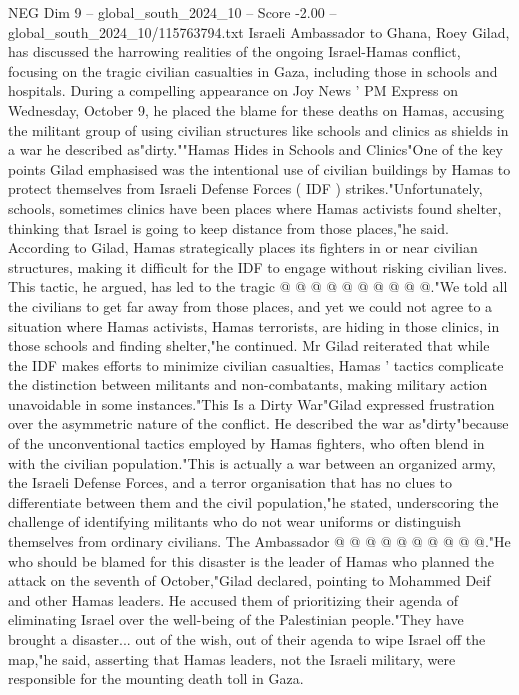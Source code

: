 \begin{textsample}{NEG Dim 9 – global\_south\_2024\_10 – Score -2.00 – global\_south\_2024\_10/115763794.txt}  \label{ex:f9_neg_370}
Israeli Ambassador to Ghana, Roey Gilad, has discussed the harrowing realities of the ongoing Israel-Hamas conflict, focusing on the tragic civilian casualties in Gaza, including those in schools and hospitals.
During a compelling appearance on Joy News ' PM Express on Wednesday, October 9, he placed the blame for these deaths on Hamas, accusing the militant group of using civilian structures like schools and clinics as shields in a war he described as"dirty.""Hamas Hides in Schools and Clinics"One of the key points Gilad emphasised was the intentional use of civilian buildings by Hamas to protect themselves from Israeli Defense Forces ( IDF ) strikes."Unfortunately, schools, sometimes clinics have been places where Hamas activists found shelter, thinking that Israel is going to keep distance from those places,"he said.
According to Gilad, Hamas strategically places its fighters in or near civilian structures, making it difficult for the IDF to engage without risking civilian lives.
This tactic, he argued, has led to the tragic @ @ @ @ @ @ @ @ @ @."We told all the civilians to get far away from those places, and yet we could not agree to a situation where Hamas activists, Hamas terrorists, are hiding in those clinics, in those schools and finding shelter,"he continued.
Mr Gilad reiterated that while the IDF makes efforts to minimize civilian casualties, Hamas ' tactics complicate the distinction between militants and non-combatants, making military action unavoidable in some instances."This Is a Dirty War"Gilad expressed frustration over the asymmetric nature of the conflict.
He described the war as"dirty"because of the unconventional tactics employed by Hamas fighters, who often blend in with the civilian population."This is actually a war between an organized army, the Israeli Defense Forces, and a terror organisation that has no clues to differentiate between them and the civil population,"he stated, underscoring the challenge of identifying militants who do not wear uniforms or distinguish themselves from ordinary civilians.
The Ambassador @ @ @ @ @ @ @ @ @ @."He who should be blamed for this disaster is the leader of Hamas who planned the attack on the seventh of October,"Gilad declared, pointing to Mohammed Deif and other Hamas leaders.
He accused them of prioritizing their agenda of eliminating Israel over the well-being of the Palestinian people."They have brought a disaster... out of the wish, out of their agenda to wipe Israel off the map,"he said, asserting that Hamas leaders, not the Israeli military, were responsible for the mounting death toll in Gaza.

\end{textsample}
